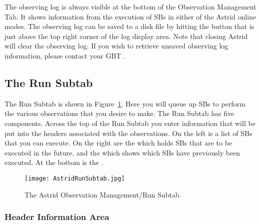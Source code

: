 The observing log is always visible at the bottom of the Observation Management
Tab.  It shows information from the execution of \glspl{SB} in either of the
\gls{Astrid} online modes.  The observing log can be saved to a disk file
by hitting the  button that is just above the top right corner of the
log display area.  Note that closing \gls{Astrid} will clear the observing log.
If you wish to retrieve unsaved observing log information, please contact your
\gls{GBT} .


\newpage


\subsection{The Run Subtab}\label{sec:runsubtab}

The Run Subtab is shown in Figure~\ref{fig:astridrun}.  Here you will queue up
\glspl{SB} to perform the various observations that you desire to make. The Run
Subtab has five components.  Across the top of the Run Subtab you enter
information that will be put into the headers associated with the observations.
On the left is a list of \glspl{SB} that you can execute.  On the right are the
 which holds \glspl{SB} that are to be executed in the future,
and the  which shows which \glspl{SB} have previously been
executed.  At the bottom is the .

\begin{figure}[!h]
\begin{center}
\texttt{[image: AstridRunSubtab.jpg]}
\caption[Astrid Observation Management/Run Subtab]
{The \gls{Astrid} Observation Management/Run Subtab. \label{fig:astridrun} }
\end{center}
\end{figure}

\subsubsection{Header Information Area}

